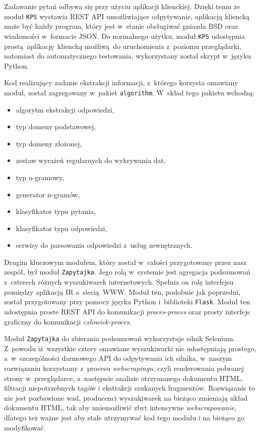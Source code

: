 Zadawanie pytań odbywa się przy użyciu aplikacji klienckiej. Dzięki temu że moduł \texttt{KPS} wystawia REST API umożliwiające odpytywanie, aplikacją kliencką może być każdy program, który jest w~stanie obsługiwać gniazda BSD oraz wiadomości w~formacie JSON. Do normalnego użytku, moduł \texttt{KPS} udostępnia prostą aplikację kliencką możliwą do uruchomienia z~poziomu przeglądarki, natomiast do automatycznego testowania, wykorzystany został skrypt w~języku Python.

Kod realizujący zadanie ekstrakcji informacji, z~którego korzysta omawiany moduł, został zagregowany w~pakiet \texttt{algorithm}. W~skład tego pakietu wchodzą:
\begin{itemize}
    \item algorytm ekstrakcji odpowiedzi,
    \item typ domeny podstawowej,
    \item typ domeny złożonej,
    \item zestaw wyrażeń regularnych do wykrywania dat,
    \item typ n-gramowy,
    \item generator n-gramów,
    \item klasyfikator typu pytania,
    \item klasyfikator typu odpowiedzi,
    \item serwisy do parsowania odpowiedzi z~usług zewnętrznych.
\end{itemize}

Drugim kluczowym modułem, który został w~całości przygotowany przez nasz zespół, był moduł \texttt{Zapytajka}. Jego rolą w~systemie jest agregacja podsumowań z~czterech różnych wyszukiwarek internetowych. Spełnia on rolę interfejsu pomiędzy aplikacją IR a~siecią~WWW. Moduł ten, podobnie jak poprzedni, został przygotowany przy pomocy języka Python i~biblioteki \texttt{Flask}. Moduł ten udostępnia proste REST API do komunikacji \textit{proces-proces} oraz prosty interfejs graficzny do komunikacji \textit{człowiek-proces}.

Moduł \texttt{Zapytajka} do zbierania podsumowań wykorzystuje silnik Selenium. Z~powodu iż wszystkie cztery omawiane wyszukiwarki nie udostępniają prostego, a~w~szczególności darmowego API do odpytywania ich silnika, w~naszym rozwiązaniu korzystamy z~procesu \textit{webscrapingu}, czyli renderowania pobranej strony w~przeglądarce, a~następnie analizie otrzymanego dokumentu HTML, filtracji niepotrzebnych tagów i ekstrakcji szukanych fragmentów. Rozwiązanie to nie jest pozbawione wad, producenci wyszukiwarek na bieżąco zmieniają układ dokumentu HTML, tak aby uniemożliwić zbyt intensywne \textit{webscrapowanie}, dlatego też ważne jest aby stale utrzymywać kod tego modułu i na bieżąco go modyfikować.


